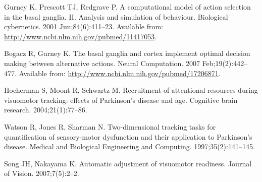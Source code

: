 \documentclass[10pt,letterpaper]{article}
\providecommand{\DIFdelbegin}{} %
\providecommand{\DIFdelend}{} %
\begin{document}
\begin{thebibliography}{10}
Gurney K, Prescott TJ, Redgrave P.
\newblock A computational model of action selection in the basal ganglia. {II}.
  {Analysis} and simulation of behaviour.
\newblock Biological cybernetics. 2001 Jun;84(6):411--23.
\newblock Available from: \url{http://www.ncbi.nlm.nih.gov/pubmed/11417053}.

Bogacz R, Gurney K.
\newblock The basal ganglia and cortex implement optimal decision making
  between alternative actions.
\newblock Neural Computation. 2007 Feb;19(2):442--477.
\newblock Available from: \url{http://www.ncbi.nlm.nih.gov/pubmed/17206871}.

Hocherman S, Moont R, Schwartz M.
\newblock Recruitment of attentional resources during visuomotor tracking:
  effects of {Parkinson}'s disease and age.
\newblock Cognitive brain research. 2004;21(1):77--86.

Watson R, Jones R, Sharman N.
\newblock Two-dimensional tracking tasks for quantification of sensory-motor
  dysfunction and their application to {Parkinson}'s disease.
\newblock Medical and Biological Engineering and Computing.
  1997;35(2):141--145.

Song JH, Nakayama K.
\newblock Automatic adjustment of visuomotor readiness.
\newblock Journal of Vision. 2007;7(5):2--2.

\end{thebibliography}
\DIFdelbegin %

\DIFdelend
\end{document}
